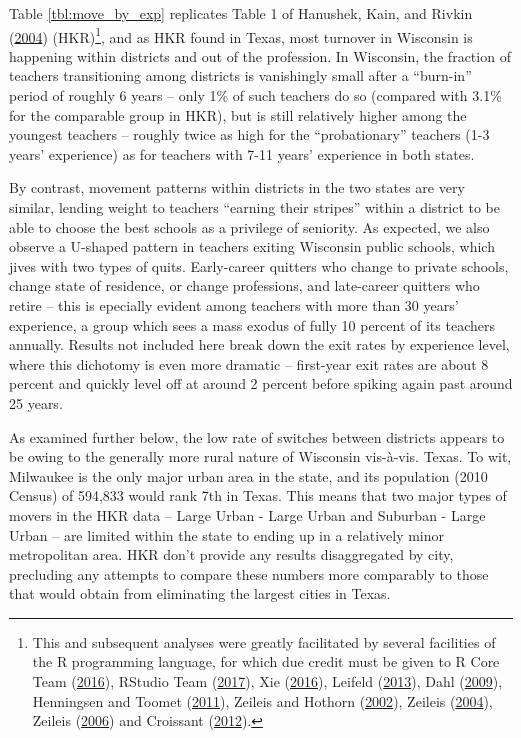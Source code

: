 \documentclass[12pt,]{article}
\let\rmarkdownfootnote\footnote%
\def\footnote{\protect\rmarkdownfootnote}
\begin{document}
Table \ref{tbl:move_by_exp} replicates Table 1 of Hanushek, Kain, and
Rivkin (\protect\hyperlink{ref-hanushek}{2004}) (HKR)\footnote{This and
  subsequent analyses were greatly facilitated by several facilities of
  the R programming language, for which due credit must be given to R
  Core Team (\protect\hyperlink{ref-r}{2016}), RStudio Team
  (\protect\hyperlink{ref-rstudio}{2017}), Xie
  (\protect\hyperlink{ref-xie}{2016}), Leifeld
  (\protect\hyperlink{ref-leifeld}{2013}), Dahl
  (\protect\hyperlink{ref-dahl}{2009}), Henningsen and Toomet
  (\protect\hyperlink{ref-henningsen}{2011}), Zeileis and Hothorn
  (\protect\hyperlink{ref-zeileis2002}{2002}), Zeileis
  (\protect\hyperlink{ref-zeileis2004}{2004}), Zeileis
  (\protect\hyperlink{ref-zeileis2006}{2006}) and Croissant
  (\protect\hyperlink{ref-croissant}{2012}).}, and as HKR found in
Texas, most turnover in Wisconsin is happening within districts and out
of the profession. In Wisconsin, the fraction of teachers transitioning
among districts is vanishingly small after a ``burn-in'' period of
roughly 6 years -- only 1\% of such teachers do so (compared with 3.1\%
for the comparable group in HKR), but is still relatively higher among
the youngest teachers -- roughly twice as high for the ``probationary''
teachers (1-3 years' experience) as for teachers with 7-11 years'
experience in both states.

By contrast, movement patterns within districts in the two states are
very similar, lending weight to teachers ``earning their stripes''
within a district to be able to choose the best schools as a privilege
of seniority. As expected, we also observe a U-shaped pattern in
teachers exiting Wisconsin public schools, which jives with two types of
quits. Early-career quitters who change to private schools, change state
of residence, or change professions, and late-career quitters who retire
-- this is epecially evident among teachers with more than 30 years'
experience, a group which sees a mass exodus of fully 10 percent of its
teachers annually. Results not included here break down the exit rates
by experience level, where this dichotomy is even more dramatic --
first-year exit rates are about 8 percent and quickly level off at
around 2 percent before spiking again past around 25 years.

As examined further below, the low rate of switches between districts
appears to be owing to the generally more rural nature of Wisconsin
vis-à-vis. Texas. To wit, Milwaukee is the only major urban area in the
state, and its population (2010 Census) of 594,833 would rank 7th in
Texas. This means that two major types of movers in the HKR data --
Large Urban - Large Urban and Suburban - Large Urban -- are limited
within the state to ending up in a relatively minor metropolitan area.
HKR don't provide any results disaggregated by city, precluding any
attempts to compare these numbers more comparably to those that would
obtain from eliminating the largest cities in Texas.
\end{document}
